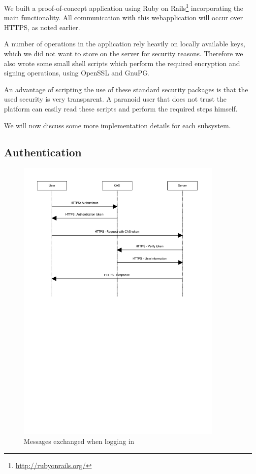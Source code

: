 \documentclass[12pt]{article}
\begin{document}

We built a proof-of-concept application using Ruby on
Rails\footnote{\url{http://rubyonrails.org/}} incorporating the main
functionality. All communication with this webapplication will occur over HTTPS,
as noted earlier.

A number of operations in the application rely heavily on locally available
keys, which we did not want to store on the server for security reasons.
Therefore we also wrote some small shell scripts which perform the required
encryption and signing operations, using OpenSSL and GnuPG.

An advantage of scripting the use of these standard security packages is that
the used security is very transparent. A paranoid user that does not trust the
platform can easily read these scripts and perform the required steps himself.

We will now discuss some more implementation details for each subsystem.

\subsection{Authentication}
\label{subsec:impl-authentication}

\begin{figure}[ht]
  \begin{center}
  \includegraphics[width=0.9\textwidth]{images/login.pdf}
  \caption{Messages exchanged when logging in}
  \label{fig:login}
  \end{center}
\end{figure}
\end{document}
